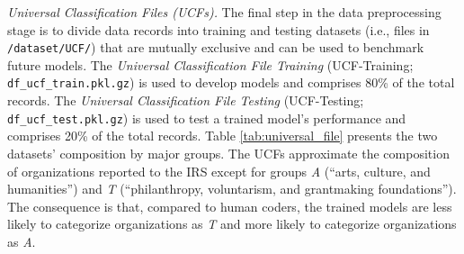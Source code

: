 \documentclass[11pt]{article}
\begin{document}
\textit{Universal Classification Files (UCFs).} The final step in the data preprocessing stage is to divide data records into training and testing datasets (i.e., files in \texttt{/dataset/UCF/}) that are mutually exclusive and can be used to benchmark future models. The \textit{Universal Classification File Training} (UCF-Training; \texttt{df\_ucf\_train.pkl.gz}) is used to develop models and comprises 80\% of the total records. The \textit{Universal Classification File Testing} (UCF-Testing; \texttt{df\_ucf\_test.pkl.gz}) is used to test a trained model's performance and comprises 20\% of the total records. Table \ref{tab:universal_file} presents the two datasets' composition by major groups. The UCFs approximate the composition of organizations reported to the IRS except for groups \textit{A} (``arts, culture, and humanities'') and \textit{T} (``philanthropy, voluntarism, and grantmaking foundations''). The consequence is that, compared to human coders, the trained models are less likely to categorize organizations as \textit{T} and more likely to categorize organizations as \textit{A}.
\end{document}
